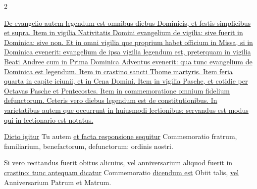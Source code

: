\documentclass[openany]{book}
\renewcommand{\\}{\par\hspace*{.1em}} %
\renewcommand{\newline}{\par \noindent}
\begin{document}
\begin{multicols*}{2}
\newline \ul{De evangelio autem legendum est omnibus diebus Dominicis, et festis simplicibus et supra. Item in vigilia Nativitatis Domini evangelium de vigilia: sive fuerit in Dominica: sive non. Et in omni vigilia que proprium habet officium in Missa, si in Dominica evenerit: evangelium de ipsa vigilia legendum est, preterquam in vigilia Beati Andree cum in Prima Dominica Adventus evenerit: qua tunc evangelium de Dominica est legendum. Item in crastino sancti Thome martyris. Item feria quarta in capite ieiunii, et in Cena Domini. Item in vigilia Pasche, et cotidie per Octavas Pasche et Pentecostes. Item in commemoratione omnium fidelium defunctorum. Ceteris vero diebus legendum est de constitutionibus. In varietatibus autem que occurrunt in huiusmodi lectionibus: servandus est modus qui in lectionario est notatus.}
\newline \ul{Dicto igitur} Tu autem \ul{et facta responsione sequitur} Commemoratio fratrum, familiarium, benefactorum, defunctorum: ordinis nostri.
\newline \ul{Si vero recitandus fuerit obitus alicuius, vel anniversarium aliquod fuerit in crastino: tunc antequam dicatur} Commemoratio \ul{dicendum est} Obiit talis, \ul{vel} Anniversarium Patrum et Matrum.

\end{multicols*}
\end{document}
